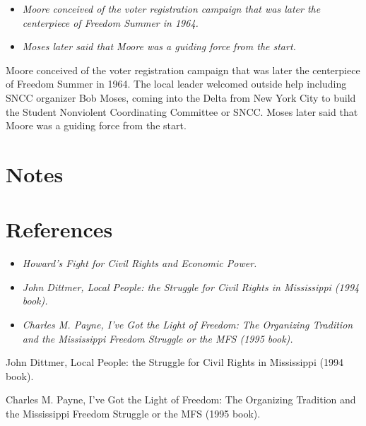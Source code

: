 \begin{itemize}
\item
  \emph{Moore conceived of the voter registration campaign that was
  later the centerpiece of Freedom Summer in 1964.}
\item
  \emph{Moses later said that Moore was a guiding force from the start.}
\end{itemize}

Moore conceived of the voter registration campaign that was later the
centerpiece of Freedom Summer in 1964. The local leader welcomed outside
help including SNCC organizer Bob Moses, coming into the Delta from New
York City to build the Student Nonviolent Coordinating Committee or
SNCC. Moses later said that Moore was a guiding force from the start.

\section{Notes}\label{notes}

\section{References}\label{references}

\begin{itemize}
\item
  \emph{Howard's Fight for Civil Rights and Economic Power.}
\item
  \emph{John Dittmer, Local People: the Struggle for Civil Rights in
  Mississippi (1994 book).}
\item
  \emph{Charles M. Payne, I've Got the Light of Freedom: The Organizing
  Tradition and the Mississippi Freedom Struggle or the MFS (1995
  book).}
\end{itemize}

John Dittmer, Local People: the Struggle for Civil Rights in Mississippi
(1994 book).

Charles M. Payne, I've Got the Light of Freedom: The Organizing
Tradition and the Mississippi Freedom Struggle or the MFS (1995 book).

